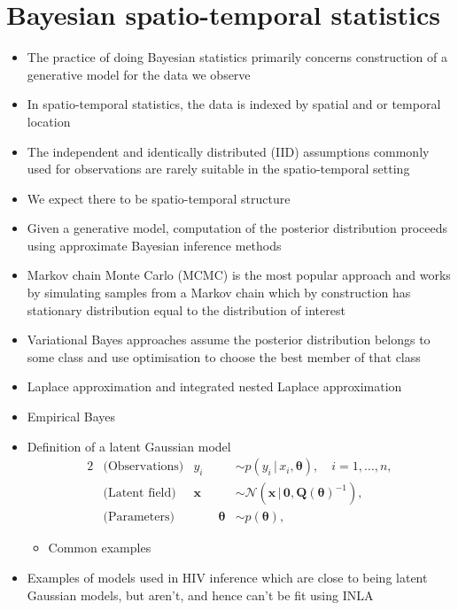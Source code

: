 \documentclass[a4paper, nobind]{templates/ociamthesis}
\providecommand{\tightlist}{%
  \setlength{\itemsep}{0pt}\setlength{\parskip}{0pt}}
\newcommand{\x}{\mathbf{x}}
\newcommand{\btheta}{\bm{\theta}}
\begin{document}
\hypertarget{bayesian-spatio-temporal-statistics}{%
\section{Bayesian spatio-temporal statistics}\label{bayesian-spatio-temporal-statistics}}

\begin{itemize}
\tightlist
\item
  The practice of doing Bayesian statistics primarily concerns construction of a generative model for the data we observe
\item
  In spatio-temporal statistics, the data is indexed by spatial and or temporal location
\item
  The independent and identically distributed (IID) assumptions commonly used for observations are rarely suitable in the spatio-temporal setting
\item
  We expect there to be spatio-temporal structure
\item
  Given a generative model, computation of the posterior distribution proceeds using approximate Bayesian inference methods
\item
  Markov chain Monte Carlo (MCMC) is the most popular approach and works by simulating samples from a Markov chain which by construction has stationary distribution equal to the distribution of interest
\item
  Variational Bayes approaches assume the posterior distribution belongs to some class and use optimisation to choose the best member of that class
\item
  Laplace approximation and integrated nested Laplace approximation
\item
  Empirical Bayes
\item
  Definition of a latent Gaussian model \autocite{rue2009approximate}
  \begin{alignat}{2}
  &\text{(Observations)}     &        y_i &\sim p(y_i \, | \, x_i, \btheta), \quad i = 1, \ldots, n, \label{eq:data} \\
  &\text{(Latent field)}     &        \x &\sim \mathcal{N}(\x \, | \, \mathbf{0}, \mathbf{Q}(\btheta)^{-1}), \label{eq:process} \\
  &\text{(Parameters)}       & \qquad \btheta &\sim p(\btheta), \label{eq:parameters}
  \end{alignat}

  \begin{itemize}
  \tightlist
  \item
    Common examples
  \end{itemize}
\item
  Examples of models used in HIV inference which are close to being latent Gaussian models, but aren't, and hence can't be fit using INLA


\end{itemize}
\end{document}
